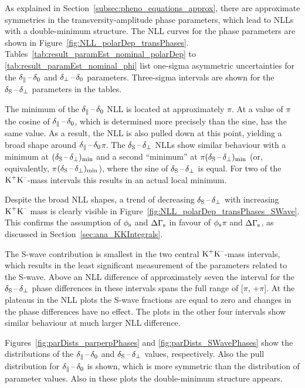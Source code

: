 As explained in Section~\ref{subsec:pheno_equations_approx}, there are approximate symmetries in the transversity-amplitude phase
parameters, which lead to NLLs with a double-minimum structure. The NLL curves for the phase parameters are shown in
Figure~\ref{fig:NLL_polarDep_transPhases}. Tables~\ref{tab:result_paramEst_nominal_polarDep} to \ref{tab:result_paramEst_nominal_phi} list
one-sigma asymmetric uncertainties for the $\delta_{\parallel}\,\text{--}\,\delta_{0}$ and $\delta_{\perp}\,\text{--}\,\delta_{0}$ parameters. Three-sigma intervals are shown for the $\delta_{\text{S}}\,\text{--}\,\delta_{\perp}$
parameters in the tables.

The minimum of the $\delta_{\parallel}\,\text{--}\,\delta_{0}$ NLL is located at approximately $\pi$. At a value of $\pi$ the cosine of
$\delta_{\parallel}\,\text{--}\,\delta_{0}$, which is determined more precisely than the sine, has the same value. As a result, the NLL is also pulled down at this
point, yielding a broad shape around $\delta_{\parallel}\,\text{--}\,\delta_{0}$\texteq$\pi$. The $\delta_{\text{S}}\,\text{--}\,\delta_{\perp}$ NLLs show similar behaviour with a minimum at
$(\delta_{\text{S}}\,\text{--}\,\delta_{\perp})_\text{min}$ and a second ``minimum'' at $\pi$\textminus$(\delta_{\text{S}}\,\text{--}\,\delta_{\perp})_\text{min}$ (or, equivalently,
\tm$\pi$\textminus$(\delta_{\text{S}}\,\text{--}\,\delta_{\perp})_\text{min}$), where the sine of $\delta_{\text{S}}\,\text{--}\,\delta_{\perp}$ is equal. For two of the $\text{K}^\text{+}\text{K}^\text{--}$-mass intervals this results in an
actual local minimum.

Despite the broad NLL shapes, a trend of decreasing $\delta_{\text{S}}\,\text{--}\,\delta_{\perp}$ with increasing $\text{K}^\text{+}\text{K}^\text{--}$ mass is clearly visible in
Figure~\ref{fig:NLL_polarDep_transPhases_SWave}. This confirms the assumption of $\phi_\text{s}$ and $\Delta\Gamma_\text{s}$ in favour of
$\phi_\text{s}$\textapprox$\pi$ and $\Delta\Gamma_\text{s}$, as discussed in Section~\ref{sec:ana_KKIntegrals}.

The S-wave contribution is smallest in the two central $\text{K}^\text{+}\text{K}^\text{--}$-mass intervals, which results in the least significant measurement of the
parameters related to the S-wave. Above an NLL difference of approximately seven the interval for the $\delta_{\text{S}}\,\text{--}\,\delta_{\perp}$ phase differences in
these intervals spans the full range of [\tm$\pi$, +$\pi$]. At the plateaus in the NLL plots the S-wave fractions are equal to zero and
changes in the phase differences have no effect. The plots in the other four intervals show similar behaviour at much larger NLL
difference.

Figures~\ref{fig:parDists_parperpPhases} and \ref{fig:parDists_SWavePhases} show the distributions of the $\delta_{\parallel}\,\text{--}\,\delta_{0}$ and $\delta_{\text{S}}\,\text{--}\,\delta_{\perp}$
values, respectively. Also the pull distribution for $\delta_{\parallel}\,\text{--}\,\delta_{0}$ is shown, which is more symmetric than the distribution of parameter
values. Also in these plots the double-minimum structure appears.

